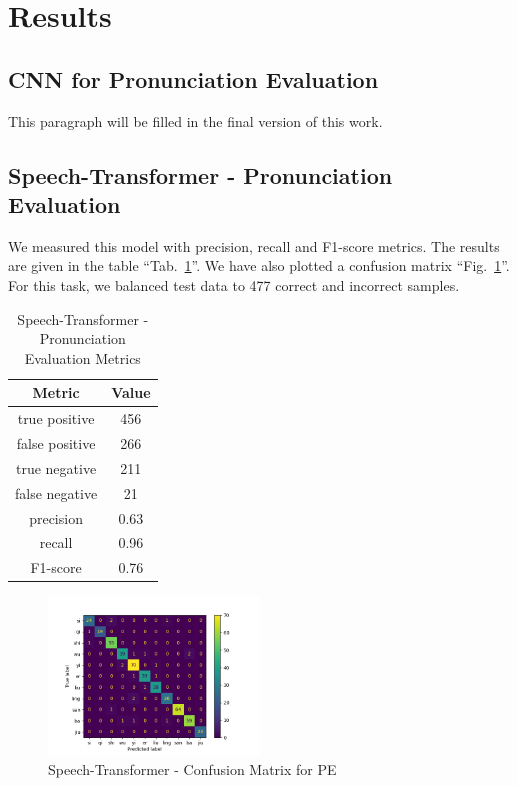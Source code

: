 \documentclass[conference]{IEEEtran}
\begin{document}
\section{Results}

\subsection{CNN for Pronunciation Evaluation}
This paragraph will be filled in the final version of this work.

\subsection{Speech-Transformer - Pronunciation Evaluation}
We measured this model with precision, recall and F1-score metrics. The results are given in the table ``Tab.~\ref{tab_STPE}''. We have also plotted a confusion matrix ``Fig.~\ref{fig_STPE}''.
For this task, we balanced test data to 477 correct and incorrect samples.

\begin{table}[hbtp]
\caption{Speech-Transformer - Pronunciation Evaluation Metrics}
\begin{center}
\begin{tabular}{|c|c|}
\hline
\textbf{Metric} & {\textbf{Value}} \\
\hline
true positive & 456 \\
\hline
false positive & 266 \\
\hline
true negative & 211 \\
\hline
false negative & 21 \\
\hline
precision & 0.63 \\
\hline
recall & 0.96 \\
\hline
F1-score & 0.76 \\
\hline
\end{tabular}
\label{tab_STPE}
\end{center}
\end{table}

\begin{figure}[hbtp]
\centerline{\includegraphics[width=0.5\textwidth]{Figures/Fig_STPE.png}}
\caption{Speech-Transformer - Confusion Matrix for PE}
\label{fig_STPE} %
\end{figure}
\end{document}
